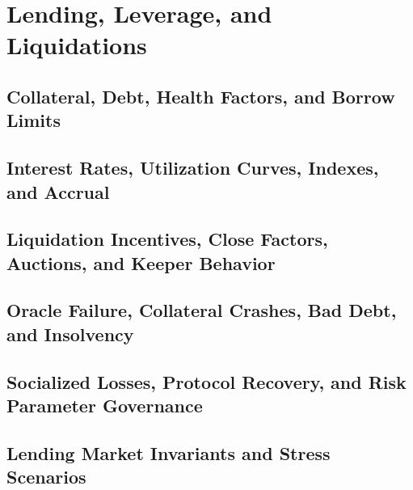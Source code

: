 \chapter{Lending, Leverage, and Liquidations}

\section{Collateral, Debt, Health Factors, and Borrow Limits}

\section{Interest Rates, Utilization Curves, Indexes, and Accrual}

\section{Liquidation Incentives, Close Factors, Auctions, and Keeper Behavior}

\section{Oracle Failure, Collateral Crashes, Bad Debt, and Insolvency}

\section{Socialized Losses, Protocol Recovery, and Risk Parameter Governance}

\section{Lending Market Invariants and Stress Scenarios}
